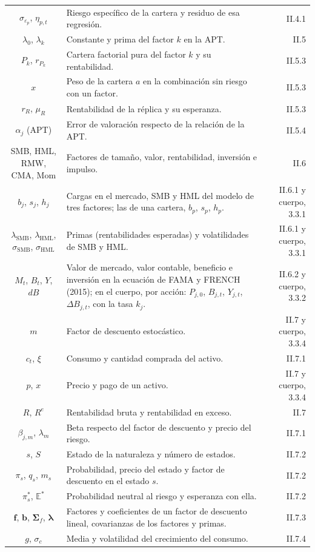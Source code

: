 \documentclass[10pt,a4paper]{article}
\begin{document}
\begin{longtable}{SMD}
$\sigma_{\varepsilon_p}$, $\eta_{p,t}$ & Riesgo específico de la cartera y residuo de esa regresión. & II.4.1\\
$\lambda_0$, $\lambda_k$ & Constante y prima del factor $k$ en la APT. & II.5\\
$P_k$, $r_{P_k}$ & Cartera factorial pura del factor $k$ y su rentabilidad. & II.5.3\\
$x$ & Peso de la cartera $a$ en la combinación sin riesgo con un factor. & II.5.3\\
$r_R$, $\mu_R$ & Rentabilidad de la réplica y su esperanza. & II.5.3\\
$\alpha_j$ (APT) & Error de valoración respecto de la relación de la APT. & II.5.4\\
SMB, HML, RMW, CMA, Mom & Factores de tamaño, valor, rentabilidad, inversión e impulso. & II.6\\
$b_j$, $s_j$, $h_j$ & Cargas en el mercado, SMB y HML del modelo de tres factores; las de una cartera, $b_p$, $s_p$, $h_p$. & II.6.1 y cuerpo, 3.3.1\\
$\lambda_{\text{SMB}}$, $\lambda_{\text{HML}}$, $\sigma_{\text{SMB}}$, $\sigma_{\text{HML}}$ & Primas (rentabilidades esperadas) y volatilidades de SMB y HML. & II.6.1 y cuerpo, 3.3.1\\
$M_t$, $B_t$, $Y$, $dB$ & Valor de mercado, valor contable, beneficio e inversión en la ecuación de FAMA y FRENCH (2015); en el cuerpo, por acción: $P_{j,0}$, $B_{j,t}$, $Y_{j,t}$, $\Delta B_{j,t}$, con la tasa $k_j$. & II.6.2 y cuerpo, 3.3.2\\
$m$ & Factor de descuento estocástico. & II.7 y cuerpo, 3.3.4\\
$c_t$, $\xi$ & Consumo y cantidad comprada del activo. & II.7.1\\
$p$, $x$ & Precio y pago de un activo. & II.7 y cuerpo, 3.3.4\\
$R$, $R^e$ & Rentabilidad bruta y rentabilidad en exceso. & II.7\\
$\beta_{j,m}$, $\lambda_m$ & Beta respecto del factor de descuento y precio del riesgo. & II.7.1\\
$s$, $S$ & Estado de la naturaleza y número de estados. & II.7.2\\
$\pi_s$, $q_s$, $m_s$ & Probabilidad, precio del estado y factor de descuento en el estado $s$. & II.7.2\\
$\pi_s^*$, $\mathbb E^*$ & Probabilidad neutral al riesgo y esperanza con ella. & II.7.2\\
$\mathbf f$, $\mathbf b$, $\boldsymbol\Sigma_f$, $\boldsymbol\lambda$ & Factores y coeficientes de un factor de descuento lineal, covarianzas de los factores y primas. & II.7.3\\
$g$, $\sigma_c$ & Media y volatilidad del crecimiento del consumo. & II.7.4\\
\end{longtable}
\end{document}
